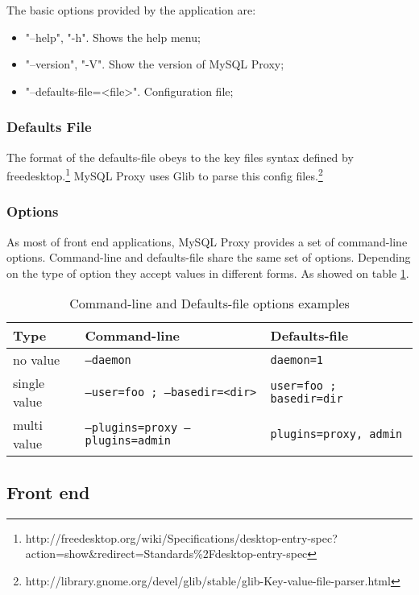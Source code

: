 The basic options provided by the application are:

\begin{itemize}
	\item "--help", "-h". Shows the help menu;
	\item "--version", "-V". Show the version of MySQL Proxy;
	\item "--defaults-file=<file>". Configuration file; 
\end{itemize}

\subsubsection{Defaults File}

The format of the defaults-file obeys to the key files syntax defined by freedesktop.\footnote{http://freedesktop.org/wiki/Specifications/desktop-entry-spec?action=show\&redirect=Standards\%2Fdesktop-entry-spec}
MySQL Proxy uses Glib to parse this config files.\footnote{http://library.gnome.org/devel/glib/stable/glib-Key-value-file-parser.html}

\subsubsection{Options}

As most of front end applications, MySQL Proxy provides a set of command-line options. 
Command-line and defaults-file share the same set of options. Depending on the type of option they accept values in different forms. As showed on table 
\ref{tab:table_options}.

\begin{table}[h!]
\centering
    \begin{tabular}{ | l | l | l |}
    \hline
    Type & Command-line & Defaults-file \\ \hline
    no value & \texttt{---daemon} & \texttt{daemon=1} \\ \hline
	single value & \texttt{---user=foo ; ---basedir=<dir>} & \texttt{user=foo ; basedir=dir} \\ \hline
	multi value & \texttt{---plugins=proxy ---plugins=admin} & \texttt{plugins=proxy, admin} \\
    \hline
    \end{tabular}

\caption{Command-line and Defaults-file options examples}
\label{tab:table_options}
\end{table}


\subsection{Front end}

